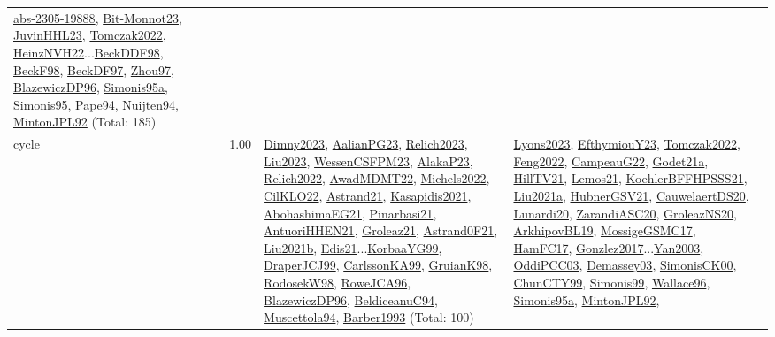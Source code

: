 {\begin{longtable}{p{3cm}r>{\raggedright\arraybackslash}p{6cm}>{\raggedright\arraybackslash}p{6cm}>{\raggedright\arraybackslash}p{8cm}}
\hyperref[detail:abs-2305-19888]{abs-2305-19888}, \hyperref[detail:Bit-Monnot23]{Bit-Monnot23}, \hyperref[detail:JuvinHHL23]{JuvinHHL23}, \hyperref[detail:Tomczak2022]{Tomczak2022}, \hyperref[detail:HeinzNVH22]{HeinzNVH22}...\hyperref[detail:BeckDDF98]{BeckDDF98}, \hyperref[detail:BeckF98]{BeckF98}, \hyperref[detail:BeckDF97]{BeckDF97}, \hyperref[detail:Zhou97]{Zhou97}, \hyperref[detail:BlazewiczDP96]{BlazewiczDP96}, \hyperref[detail:Simonis95a]{Simonis95a}, \hyperref[detail:Simonis95]{Simonis95}, \hyperref[detail:Pape94]{Pape94}, \hyperref[detail:Nuijten94]{Nuijten94}, \hyperref[detail:MintonJPL92]{MintonJPL92} (Total: 185)\\
\index{cycle}\index{Constraints!cycle}cycle &  1.00 & \hyperref[detail:Dimny2023]{Dimny2023}, \hyperref[detail:AalianPG23]{AalianPG23}, \hyperref[detail:Relich2023]{Relich2023}, \hyperref[detail:Liu2023]{Liu2023}, \hyperref[detail:WessenCSFPM23]{WessenCSFPM23}, \hyperref[detail:AlakaP23]{AlakaP23}, \hyperref[detail:Relich2022]{Relich2022}, \hyperref[detail:AwadMDMT22]{AwadMDMT22}, \hyperref[detail:Michels2022]{Michels2022}, \hyperref[detail:CilKLO22]{CilKLO22}, \hyperref[detail:Astrand21]{Astrand21}, \hyperref[detail:Kasapidis2021]{Kasapidis2021}, \hyperref[detail:AbohashimaEG21]{AbohashimaEG21}, \hyperref[detail:Pinarbasi21]{Pinarbasi21}, \hyperref[detail:AntuoriHHEN21]{AntuoriHHEN21}, \hyperref[detail:Groleaz21]{Groleaz21}, \hyperref[detail:Astrand0F21]{Astrand0F21}, \hyperref[detail:Liu2021b]{Liu2021b}, \hyperref[detail:Edis21]{Edis21}...\hyperref[detail:KorbaaYG99]{KorbaaYG99}, \hyperref[detail:DraperJCJ99]{DraperJCJ99}, \hyperref[detail:CarlssonKA99]{CarlssonKA99}, \hyperref[detail:GruianK98]{GruianK98}, \hyperref[detail:RodosekW98]{RodosekW98}, \hyperref[detail:RoweJCA96]{RoweJCA96}, \hyperref[detail:BlazewiczDP96]{BlazewiczDP96}, \hyperref[detail:BeldiceanuC94]{BeldiceanuC94}, \hyperref[detail:Muscettola94]{Muscettola94}, \hyperref[detail:Barber1993]{Barber1993} (Total: 100) & \hyperref[detail:Lyons2023]{Lyons2023}, \hyperref[detail:EfthymiouY23]{EfthymiouY23}, \hyperref[detail:Tomczak2022]{Tomczak2022}, \hyperref[detail:Feng2022]{Feng2022}, \hyperref[detail:CampeauG22]{CampeauG22}, \hyperref[detail:Godet21a]{Godet21a}, \hyperref[detail:HillTV21]{HillTV21}, \hyperref[detail:Lemos21]{Lemos21}, \hyperref[detail:KoehlerBFFHPSSS21]{KoehlerBFFHPSSS21}, \hyperref[detail:Liu2021a]{Liu2021a}, \hyperref[detail:HubnerGSV21]{HubnerGSV21}, \hyperref[detail:CauwelaertDS20]{CauwelaertDS20}, \hyperref[detail:Lunardi20]{Lunardi20}, \hyperref[detail:ZarandiASC20]{ZarandiASC20}, \hyperref[detail:GroleazNS20]{GroleazNS20}, \hyperref[detail:ArkhipovBL19]{ArkhipovBL19}, \hyperref[detail:MossigeGSMC17]{MossigeGSMC17}, \hyperref[detail:HamFC17]{HamFC17}, \hyperref[detail:Gonzlez2017]{Gonzlez2017}...\hyperref[detail:Yan2003]{Yan2003}, \hyperref[detail:OddiPCC03]{OddiPCC03}, \hyperref[detail:Demassey03]{Demassey03}, \hyperref[detail:SimonisCK00]{SimonisCK00}, \hyperref[detail:ChunCTY99]{ChunCTY99}, \hyperref[detail:Simonis99]{Simonis99}, \hyperref[detail:Wallace96]{Wallace96}, \hyperref[detail:Simonis95a]{Simonis95a}, \hyperref[detail:MintonJPL92]{MintonJPL92}, 
\end{longtable}}
